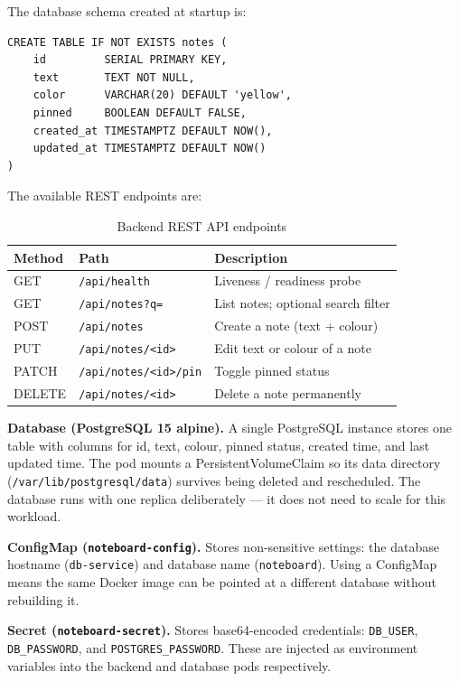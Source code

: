 \documentclass[12pt,a4paper]{article}
\begin{document}
The database schema created at startup is:

\begin{lstlisting}[style=python, caption={Database schema initialised by the Flask backend (app.py)}]
CREATE TABLE IF NOT EXISTS notes (
    id         SERIAL PRIMARY KEY,
    text       TEXT NOT NULL,
    color      VARCHAR(20) DEFAULT 'yellow',
    pinned     BOOLEAN DEFAULT FALSE,
    created_at TIMESTAMPTZ DEFAULT NOW(),
    updated_at TIMESTAMPTZ DEFAULT NOW()
)
\end{lstlisting}

The available REST endpoints are:

\begin{table}[h]
\centering
\begin{tabular}{@{}lll@{}}
\toprule
\textbf{Method} & \textbf{Path} & \textbf{Description} \\
\midrule
GET    & \texttt{/api/health}          & Liveness / readiness probe \\
GET    & \texttt{/api/notes?q=}        & List notes; optional search filter \\
POST   & \texttt{/api/notes}           & Create a note (text + colour) \\
PUT    & \texttt{/api/notes/<id>}      & Edit text or colour of a note \\
PATCH  & \texttt{/api/notes/<id>/pin}  & Toggle pinned status \\
DELETE & \texttt{/api/notes/<id>}      & Delete a note permanently \\
\bottomrule
\end{tabular}
\caption{Backend REST API endpoints}
\end{table}

\textbf{Database (PostgreSQL 15 alpine).}
A single PostgreSQL instance stores one table with columns for id, text, colour, pinned status, created time, and last updated time. The pod mounts a PersistentVolumeClaim so its data directory (\texttt{/var/lib/postgresql/data}) survives being deleted and rescheduled. The database runs with one replica deliberately --- it does not need to scale for this workload.

\textbf{ConfigMap (\texttt{noteboard-config}).}
Stores non-sensitive settings: the database hostname (\texttt{db-service}) and database name (\texttt{noteboard}). Using a ConfigMap means the same Docker image can be pointed at a different database without rebuilding it.

\textbf{Secret (\texttt{noteboard-secret}).}
Stores base64-encoded credentials: \texttt{DB\_USER}, \texttt{DB\_PASSWORD}, and \texttt{POSTGRES\_PASSWORD}. These are injected as environment variables into the backend and database pods respectively.
\end{document}
